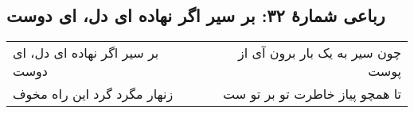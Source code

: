 \begin{center}
\section*{رباعی شمارهٔ ۳۲: بر سیر اگر نهاده ای دل، ای دوست}
\label{sec:032}
\begin{longtable}{l p{0.5cm} r}
بر سیر اگر نهاده ای دل، ای دوست
&&
چون سیر به یک بار برون آی از پوست
\\
زنهار مگرد گرد این راه مخوف
&&
تا همچو پیاز خاطرت تو بر تو ست
\\
\end{longtable}
\end{center}
